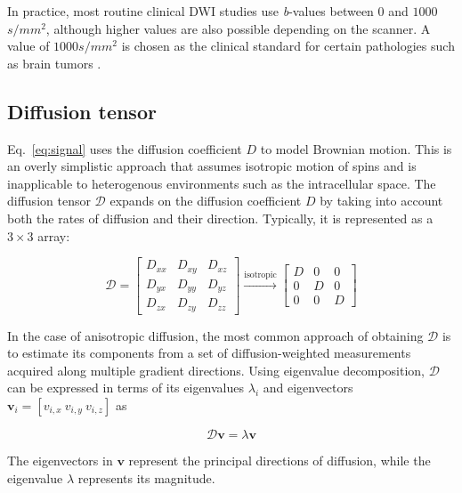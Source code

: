In practice, most routine clinical DWI studies use \textit{b}-values between $0$ and $1000$ $s/mm^2$, although higher values are also possible depending on the scanner. A value of $1000 s/mm^2$ is chosen as the clinical standard for certain pathologies such as brain tumors \cite{kazemzadeh_role_2025}.

\subsection{Diffusion tensor}
\label{subsec:background_diffusiontensor}

Eq.~\ref{eq:signal} uses the diffusion coefficient $D$ to model Brownian motion. This is an overly simplistic approach that assumes isotropic motion of spins and is inapplicable to heterogenous environments such as the intracellular space. The diffusion tensor $\mathcal{D}$ expands on the diffusion coefficient $D$ by taking into account both the rates of diffusion and their direction. Typically, it is represented as a $3 \times 3$ array:

\begin{equation}
    \mathcal{D} = 
    \begin{bmatrix}
        D_{xx} & D_{xy} & D_{xz}\\
        D_{yx} & D_{yy} & D_{yz} \\
        D_{zx} & D_{zy} & D_{zz}
    \end{bmatrix} 
    \xrightarrow{\text{isotropic}}
    \begin{bmatrix}
        D & 0 & 0\\
        0 & D & 0 \\
        0 & 0 & D
    \end{bmatrix} 
\end{equation}

In the case of anisotropic diffusion, the most common approach of obtaining $\mathcal{D}$ is to estimate its components from a set of diffusion-weighted measurements acquired along multiple gradient directions. Using eigenvalue decomposition, $\mathcal{D}$ can be expressed in terms of its eigenvalues $\lambda_i$ and eigenvectors $\mathbf{v}_i = [v_{i,x}~v_{i,y}~v_{i,z}]$ as

\begin{equation}
    \mathcal{D} \mathbf{v} = \lambda \mathbf{v}
\end{equation}

The eigenvectors in $\mathbf{v}$ represent the principal directions of diffusion, while the eigenvalue $\lambda$ represents its magnitude.

